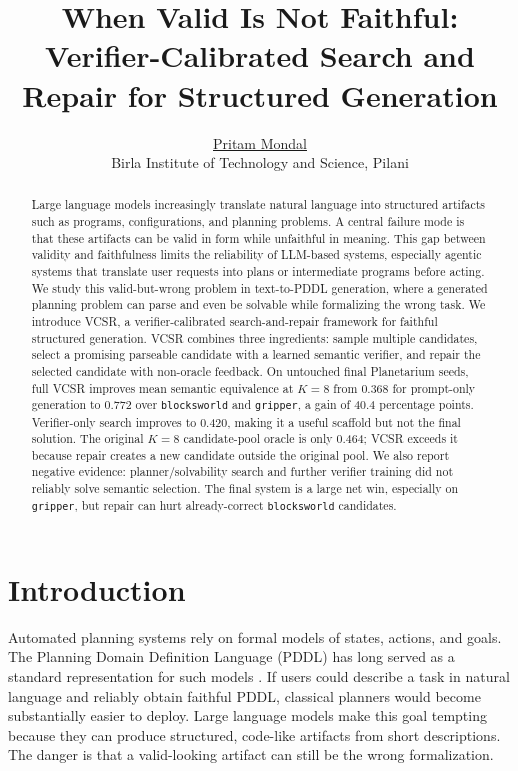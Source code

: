 \documentclass[11pt]{article}
\title{When Valid Is Not Faithful:\\
Verifier-Calibrated Search and Repair for Structured Generation}
\author{
\href{mailto:ultimatepritam@hotmail.com}{Pritam Mondal}\\
Birla Institute of Technology and Science, Pilani
}
\date{}
\newcommand{\vcsr}{\textsc{VCSR}\xspace}
\newcommand{\pddl}{\textsc{PDDL}\xspace}
\begin{document}
\maketitle

\begin{abstract}
Large language models increasingly translate natural language into structured
artifacts such as programs, configurations, and planning problems. A central
failure mode is that these artifacts can be valid in form while unfaithful in
meaning. This gap between validity and faithfulness limits the reliability of
LLM-based systems, especially agentic systems that translate user requests into
plans or intermediate programs before acting. We study this valid-but-wrong
problem in text-to-\pddl generation, where a generated planning problem can
parse and even be solvable while formalizing the wrong task. We introduce
\vcsr, a verifier-calibrated search-and-repair framework for faithful
structured generation. \vcsr combines three ingredients: sample multiple
candidates, select a promising parseable candidate with a learned semantic
verifier, and repair the selected candidate with non-oracle feedback. On
untouched final Planetarium seeds, full \vcsr improves mean semantic
equivalence at $K=8$ from 0.368 for prompt-only generation to 0.772 over
\texttt{blocksworld} and \texttt{gripper}, a gain of 40.4 percentage points.
Verifier-only search improves to 0.420, making it a useful scaffold but not the
final solution. The original $K=8$ candidate-pool
oracle is only 0.464; \vcsr exceeds it because repair creates a new candidate
outside the original pool. We also report negative evidence: planner/solvability
search and further verifier training did not reliably solve semantic selection.
The final system is a large net win, especially on \texttt{gripper}, but repair
can hurt already-correct \texttt{blocksworld} candidates.
\end{abstract}

\section{Introduction}

Automated planning systems rely on formal models of states, actions, and goals.
The Planning Domain Definition Language (\pddl) has long served as a standard
representation for such models \citep{ghallab1998pddl,fox2003pddl21}. If users
could describe a task in natural language and reliably obtain faithful \pddl,
classical planners would become substantially easier to deploy. Large language
models make this goal tempting because they can produce structured, code-like
artifacts from short descriptions. The danger is that a valid-looking artifact
can still be the wrong formalization.
\end{document}
